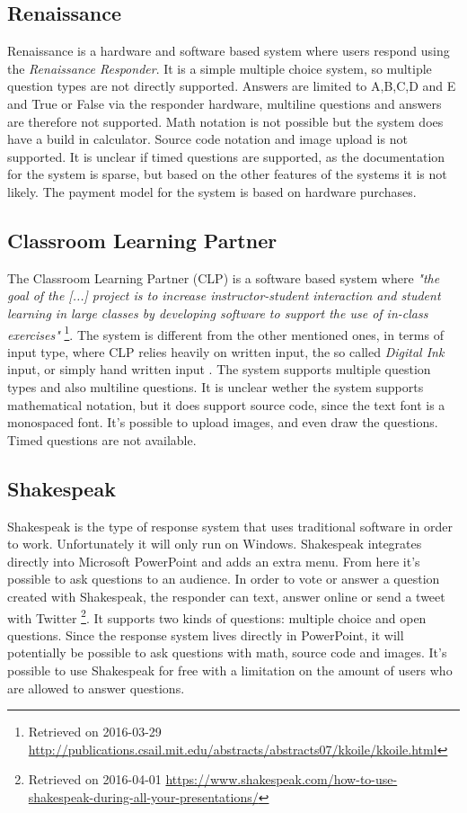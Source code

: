 \subsection*{Renaissance}
Renaissance is a hardware and software based system where users respond using the \emph{Renaissance Responder}. It is a simple multiple choice system, so multiple question types are not directly supported. Answers are limited to A,B,C,D and E and True or False via the responder hardware, multiline questions and answers are therefore not supported. Math notation is not possible but the system does have a build in calculator. Source code notation and image upload is not supported. It is unclear if timed questions are supported, as the documentation for the system is sparse, but based on the other features of the systems it is not likely. The payment model for the system is based on hardware purchases.

\subsection*{Classroom Learning Partner}
The Classroom Learning Partner (CLP) is a software based system where \emph{"the goal of the [...] project is to increase instructor-student interaction and student learning in large classes by developing software to support the use of in-class exercises"} \footnote{Retrieved on 2016-03-29 \url{http://publications.csail.mit.edu/abstracts/abstracts07/kkoile/kkoile.html}}. The system is different from the other mentioned ones, in terms of input type, where CLP relies heavily on written input, the so called \emph{Digital Ink} input, or simply hand written input \cite{koile2007supporting}. The system supports multiple question types and also multiline questions. It is unclear wether the system supports mathematical notation, but it does support source code, since the text font is a monospaced font. It's possible to upload images, and even draw the questions. Timed questions are not available.



\subsection*{Shakespeak}
Shakespeak is the type of response system that uses traditional software in order to work. Unfortunately it will only run on Windows. Shakespeak integrates directly into Microsoft PowerPoint and adds an extra menu. From here it's possible to ask questions to an audience. In order to vote or answer a question created with Shakespeak, the responder can text, answer online or send a tweet with Twitter \footnote{Retrieved on 2016-04-01 \url{https://www.shakespeak.com/how-to-use-shakespeak-during-all-your-presentations/}}. It supports two kinds of questions: multiple choice and open questions. Since the response system lives directly in PowerPoint, it will potentially be possible to ask questions with math, source code and images. It's possible to use Shakespeak for free with a limitation on the amount of users who are allowed to answer questions.




